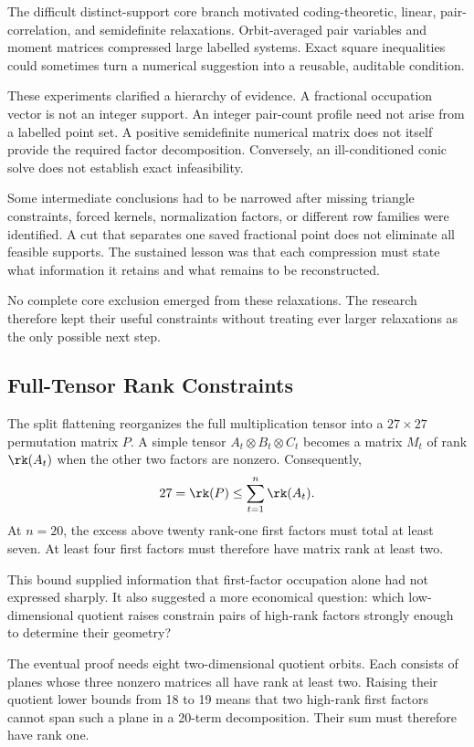 The difficult distinct-support core branch motivated coding-theoretic,
linear, pair-correlation, and semidefinite relaxations. Orbit-averaged
pair variables and moment matrices compressed large labelled systems.
Exact square inequalities could sometimes turn a numerical suggestion
into a reusable, auditable condition.

These experiments clarified a hierarchy of evidence. A fractional
occupation vector is not an integer support. An integer pair-count
profile need not arise from a labelled point set. A positive
semidefinite numerical matrix does not itself provide the required
factor decomposition. Conversely, an ill-conditioned conic solve
does not establish exact infeasibility.

Some intermediate conclusions had to be narrowed after missing
triangle constraints, forced kernels, normalization factors, or
different row families were identified. A cut that separates one
saved fractional point does not eliminate all feasible supports.
The sustained lesson was that each compression must state what
information it retains and what remains to be reconstructed.

No complete core exclusion emerged from these relaxations. The
research therefore kept their useful constraints without treating
ever larger relaxations as the only possible next step.

\subsection{Full-Tensor Rank Constraints}\label{route:full}

The split flattening reorganizes the full multiplication tensor into
a $27\times27$ permutation matrix $P$. A simple tensor
$A_t\otimes B_t\otimes C_t$ becomes a matrix $M_t$ of rank
$\rk(A_t)$ when the other two factors are nonzero. Consequently,
\[
 27=\rk(P)\le\sum_{t=1}^{n}\rk(A_t).
\]
At $n=20$, the excess above twenty rank-one first factors must total
at least seven. At least four first factors must therefore have
matrix rank at least two.

This bound supplied information that first-factor occupation alone
had not expressed sharply. It also suggested a more economical
question: which low-dimensional quotient raises constrain pairs
of high-rank factors strongly enough to determine their geometry?

The eventual proof needs eight two-dimensional quotient orbits.
Each consists of planes whose three nonzero matrices all have rank
at least two. Raising their quotient lower bounds from 18 to 19
means that two high-rank first factors cannot span such a plane
in a 20-term decomposition. Their sum must therefore have rank one.

